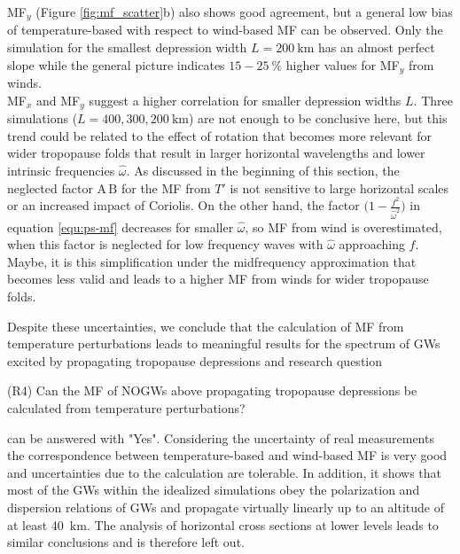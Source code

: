 MF$_y$ (Figure \ref{fig:mf_scatter}b) also shows good agreement, but a general low bias of temperature-based with respect to wind-based MF can be observed. Only the simulation for the smallest depression width $L=\SI{200}{\kilo\meter}$ has an almost perfect slope while the general picture indicates $15-\SI{25}{\percent}$ higher values for MF$_y$ from winds.\\
MF$_x$ and MF$_y$ suggest a higher correlation for smaller depression widths $L$. Three simulations ($L=400,300,\SI{200}{\kilo\meter}$) are not enough to be conclusive here, but this trend could be related to the effect of rotation that becomes more relevant for wider tropopause folds that result in larger horizontal wavelengths and lower intrinsic frequencies $\hat{\omega}$. As discussed in the beginning of this section, the neglected factor $\textrm{A} \, \textrm{B}$ for the MF from $T'$ is not sensitive to large horizontal scales or an increased impact of Coriolis. On the other hand, the factor $\bigl(1-\frac{f^2}{\hat{\omega}^2}\bigr)$ in equation \ref{equ:ps-mf} decreases for smaller $\hat{\omega}$, so MF from wind is overestimated, when this factor is neglected for low frequency waves with $\hat{\omega}$ approaching $f$. Maybe, it is this simplification under the midfrequency approximation that becomes less valid and leads to a higher MF from winds for wider tropopause folds.

Despite these uncertainties, we conclude that the calculation of MF from temperature perturbations leads to meaningful results for the spectrum of GWs excited by propagating tropopause depressions and research question 
\begin{tcolorbox}[]
    (R4) Can the MF of NOGWs above propagating tropopause depressions be calculated from temperature perturbations?
\end{tcolorbox}
can be answered with "Yes". Considering the uncertainty of real measurements the correspondence between temperature-based and wind-based MF is very good and uncertainties due to the calculation are tolerable. In addition, it shows that most of the GWs within the idealized simulations obey the polarization and dispersion relations of GWs and propagate virtually linearly up to an altitude of at least \SI{40}{\kilo\meter}. The analysis of horizontal cross sections at lower levels leads to similar conclusions and is therefore left out.



